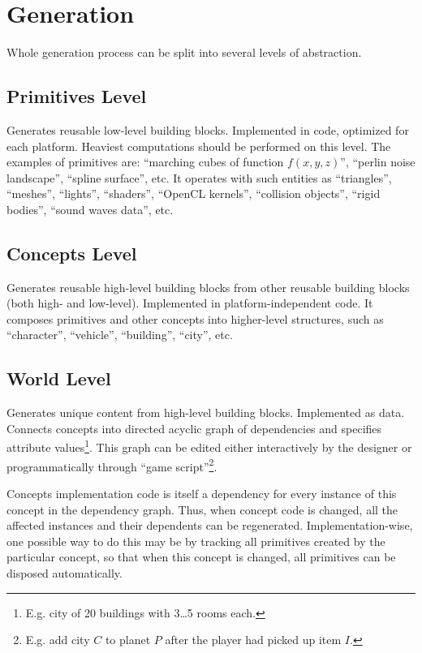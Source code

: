 \documentclass[12pt]{article}
\begin{document}
\section{Generation\label{Gen}}

Whole generation process can be split into several levels of abstraction.

\subsection{Primitives Level\label{Prim}}

Generates reusable low-level building blocks.
Implemented in code, optimized for each platform.
Heaviest computations should be performed on this level.
The examples of primitives are: ``marching cubes of function \(f(x,y,z)\)'',
``perlin noise landscape'', ``spline surface'', etc.
It operates with such entities as ``triangles'', ``meshes'', ``lights'',
``shaders'', ``OpenCL kernels'', ``collision objects'', ``rigid bodies'',
``sound waves data'', etc.

\subsection{Concepts Level\label{Concept}}

Generates reusable high-level building blocks from other reusable building
blocks (both high- and low-level).
Implemented in platform-independent code.
It composes primitives and other concepts into higher-level structures,
such as ``character'', ``vehicle'', ``building'', ``city'', etc.

\subsection{World Level\label{World}}

Generates unique content from high-level building blocks.
Implemented as data.
Connects concepts into directed acyclic graph of dependencies and specifies
attribute values\footnote{
    E.g. city of 20 buildings with 3\ldots5 rooms each.}.
This graph can be edited either interactively by the designer or
programmatically through ``game script''\footnote{
    E.g. add city \(C\) to planet \(P\) after the player had picked up
    item \(I\).}.

Concepts implementation code is itself a dependency for every
instance of this concept in the dependency graph.
Thus, when concept code is changed, all the affected instances and their
dependents can be regenerated.
Implementation-wise, one possible way to do this may be by tracking
all primitives created by the particular concept, so that when this
concept is changed, all primitives can be disposed automatically.
\end{document}

